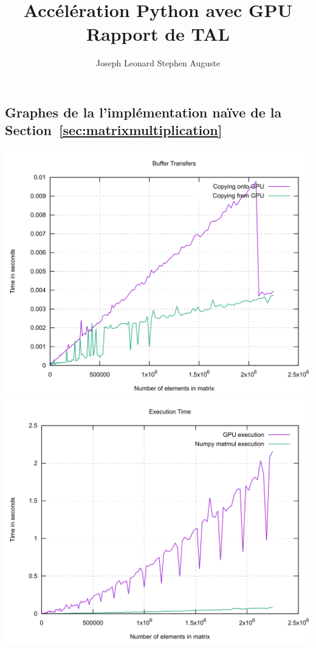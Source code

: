 \documentclass[11pt, a4paper]{article}
\title{Accélération Python avec GPU\\
\large Rapport de TAL}
\author{Joseph Leonard Stephen Auguste}
\begin{document}
\maketitle
\tableofcontents

\newpage


\newpage


\newpage


\newpage


\newpage


\newpage
\printbibliography{}

\newpage
\begin{appendices}
    \section{Graphes de la l'implémentation naïve de la Section~\ref{sec:matrixmultiplication}}
    \includegraphics[width=\textwidth]{../../resources/matrix_naive_buffer_transfer.png}
    \newpage
    \includegraphics[width=\textwidth]{../../resources/matrix_naive_execution_time.png}

\end{appendices}
\end{document}

